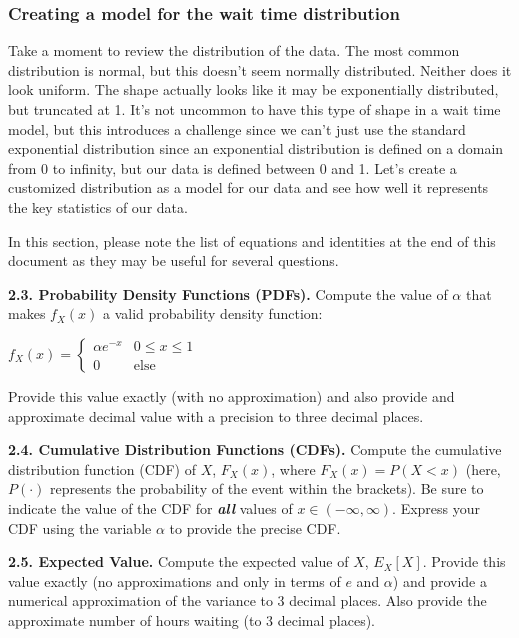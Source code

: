 \documentclass[
  letterpaper,
  DIV=11,
  numbers=noendperiod]{scrartcl}
\begin{document}
\subsubsection{Creating a model for the wait time
distribution}\label{creating-a-model-for-the-wait-time-distribution}

Take a moment to review the distribution of the data. The most common
distribution is normal, but this doesn't seem normally distributed.
Neither does it look uniform. The shape actually looks like it may be
exponentially distributed, but truncated at 1. It's not uncommon to have
this type of shape in a wait time model, but this introduces a challenge
since we can't just use the standard exponential distribution since an
exponential distribution is defined on a domain from 0 to infinity, but
our data is defined between 0 and 1. Let's create a customized
distribution as a model for our data and see how well it represents the
key statistics of our data.

In this section, please note the list of equations and identities at the
end of this document as they may be useful for several questions.

\textbf{2.3. Probability Density Functions (PDFs).} Compute the value of
\(\alpha\) that makes \(f_X(x)\) a valid probability density function:

\(f_X(x) = \begin{cases}
                \alpha e^{-x}  & 0 \leq x \leq 1 \\
                0           & \text{else}
            \end{cases}\)

Provide this value exactly (with no approximation) and also provide and
approximate decimal value with a precision to three decimal places.

\textbf{2.4. Cumulative Distribution Functions (CDFs).} Compute the
cumulative distribution function (CDF) of \(X\), \(F_X(x)\), where
\(F_X(x)=P(X<x)\) (here, \(P(\cdot)\) represents the probability of the
event within the brackets). Be sure to indicate the value of the CDF for
\textbf{\emph{all}} values of \(x\in(-\infty,\infty)\). Express your CDF
using the variable \(\alpha\) to provide the precise CDF.

\textbf{2.5. Expected Value.} Compute the expected value of \(X\),
\(E_X[X]\). Provide this value exactly (no approximations and only in
terms of \(e\) and \(\alpha\)) and provide a numerical approximation of
the variance to 3 decimal places. Also provide the approximate number of
hours waiting (to 3 decimal places).
\end{document}
